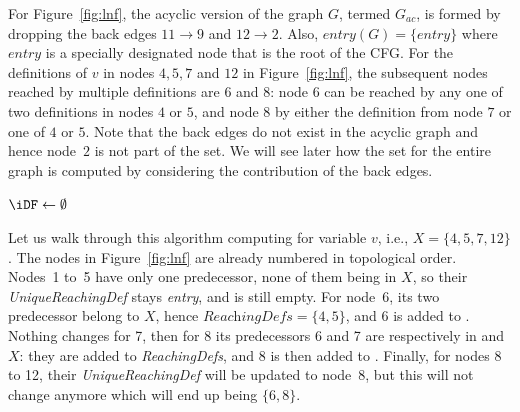 {For Figure~\ref{fig:lnf}, the acyclic version of the graph $G$, termed 
$G_{\textit{ac}}$, is formed by dropping the back edges $11 \rightarrow 9$ and $12 
\rightarrow 2$. Also, $\textit{entry}(G) = \{\textit{entry}\}$ where 
$\textit{entry}$ is a specially designated node that is the root of the 
CFG. For the definitions of $v$ in nodes $4,5,7$ and $12$ in 
Figure~\ref{fig:lnf}, the subsequent nodes reached by multiple definitions 
are $6$ and $8$: node $6$ can be reached by any one of two definitions in 
nodes $4$ or $5$, and node $8$ by either the definition from node 
$7$ or one of $4$ or $5$. Note that the back edges do not exist in the 
acyclic graph and hence node~$2$ is not part of the \iDF set. We will see 
later how the \iDF set for the entire graph is computed by considering the 
contribution of the back edges. 




\begin{algorithm}
  \caption{%
  Ramalingam's algorithm for \iDF in an acyclic graph.}
  \label{algo:ramaIDF}

  $\iDF \gets \emptyset$\;
  \Return{$\iDF$}   
\end{algorithm}

Let us walk through this algorithm computing \iDF for variable $v$, i.e., $X = \{4,5,7,12\}$. The 
nodes in Figure~\ref{fig:lnf} are already numbered in topological order. Nodes~1 to~5 
have only one predecessor, none of them being in $X$, so their 
\textit{UniqueReachingDef} stays \textit{entry}, and \iDF is still empty. For 
node~6, its two predecessor belong to $X$, hence $\textit{ReachingDefs} = 
\{4,5\}$, and 6 is added to \iDF. Nothing changes for 7, then for 8 its 
predecessors 6 and 7 are respectively in \iDF and $X$: they are added to 
\textit{ReachingDefs}, and 8 is then added to \iDF. Finally, for nodes 8 to 12, 
their \textit{UniqueReachingDef} will be updated to node~8, but this will not 
change \iDF anymore which will end up being $\{6,8\}$.


}
